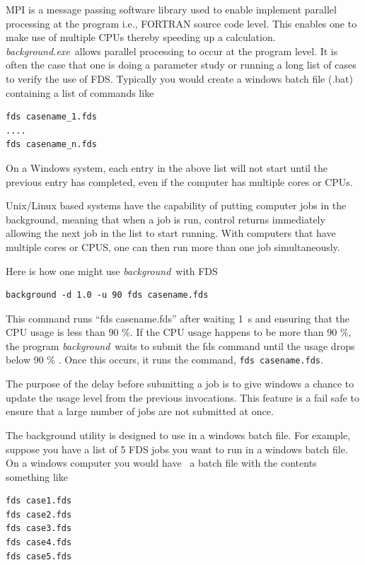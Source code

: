 \documentclass[11pt,twoside]{book}
\begin{document}
MPI is a message passing software library used to enable implement parallel processing
at the program i.e., FORTRAN source code level.  This enables one to make use of
multiple CPUs thereby speeding up a calculation. {\em background.exe}\ allows parallel
processing to occur at the program level.  It is often the case that one is doing a
parameter study or running a long list of cases to verify the use of FDS. Typically you
would create a windows batch file (.bat) containing a list of commands like

\begin{lstlisting}
fds casename_1.fds
....
fds casename_n.fds
\end{lstlisting}

On a Windows system, each entry in the above list will not start until the previous entry
has completed, even if the computer has multiple cores or CPUs.

Unix/Linux based systems have the capability of putting computer jobs in the background,
meaning that when a job is run, control returns immediately allowing the next job in the
list to start running.  With computers that have multiple cores or CPUS, one can then run
more than one job simultaneously.

Here is how one might use {\em background}\ with FDS

\begin{lstlisting}
background -d 1.0 -u 90 fds casename.fds
\end{lstlisting}

This command runs ``fds casename.fds'' after waiting 1~s and ensuring that the CPU usage is
less than 90 \%. If the CPU usage happens to be more than 90 \%, the program {\em background}\
waits to submit the fds command until the usage drops below 90 \% .  Once this occurs, it runs
the command, {\tt fds casename.fds}.

The purpose of the delay before submitting a job is to give windows a
chance to update the usage level from the
previous invocations.  This feature is a fail safe to ensure that a
large number of jobs are not
submitted at once.

The background utility is designed to use in a windows batch file.
For example, suppose you have
a list of 5 FDS jobs you want to run in a windows batch file. On a
windows computer you would have \
a batch file with the contents something like

\begin{lstlisting}
fds case1.fds
fds case2.fds
fds case3.fds
fds case4.fds
fds case5.fds
\end{lstlisting}
\end{document}
